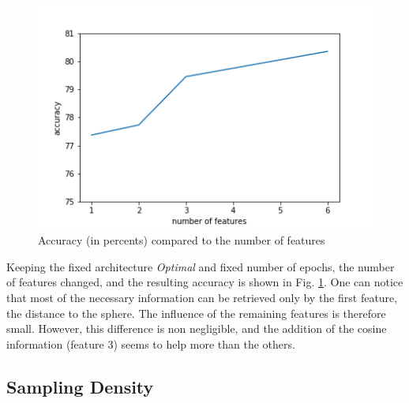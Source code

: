 \documentclass[11pt]{report}
\begin{document}
\begin{figure}[!ht]
    \centering
    \includegraphics[width=0.5\linewidth]{figures/feat_inf.png}
    \caption{Accuracy (in percents) compared to the number of features}
    \label{fig:feat_influece}
\end{figure}
Keeping the fixed architecture \emph{Optimal} and fixed number of epochs, the number of features changed, and the resulting accuracy is shown in Fig. \ref{fig:feat_influece}. One can notice that most of the necessary information can be retrieved only by the first feature, the distance to the sphere. The influence of the remaining features is therefore small.
However, this difference is non negligible, and the addition of the cosine information (feature 3) seems to help more than the others.

\subsection{Sampling Density}
\end{document}
